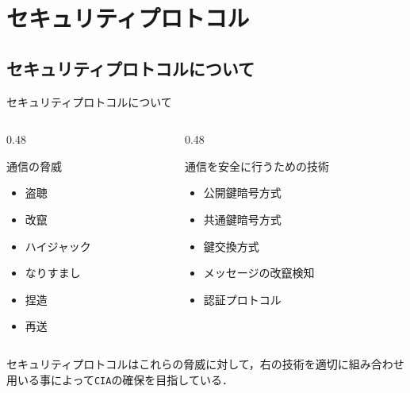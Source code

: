 \documentclass[11pt, aspectratio=169]{beamer}
\begin{document}
\section{セキュリティプロトコル}

\subsection{セキュリティプロトコルについて}
\begin{frame}{セキュリティプロトコルについて}
  \begin{columns}
    \begin{column}{0.48\textwidth}
      \begin{alertblock}{通信の脅威}
        \begin{itemize}
          \item 盗聴
          \item 改竄
          \item ハイジャック
          \item なりすまし
          \item 捏造
          \item 再送
        \end{itemize}
      \end{alertblock}
    \end{column}
    \begin{column}{0.48\textwidth}
      \begin{block}{通信を安全に行うための技術}
        \begin{itemize}
          \vspace{0.8em}
          \item 公開鍵暗号方式
          \item 共通鍵暗号方式
          \item 鍵交換方式
          \item メッセージの改竄検知
          \item 認証プロトコル
          \vspace{0.8em}
        \end{itemize}
      \end{block}
    \end{column}
  \end{columns}
  \vspace{0.5em}
  セキュリティプロトコルはこれらの脅威に対して，右の技術を適切に組み合わせ用いる事によって\texttt{CIA}の確保を目指している．
\end{frame}
\end{document}
